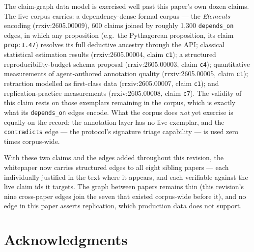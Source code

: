 \documentclass[11pt]{rrxiv}
\begin{document}
\begin{claim}[title=The claim-graph substrate is exercised beyond this paper, type=empirical, evidence=observation, labels={state-of-the-network, small-n}]
\label{claim:corpus-dogfooding}
The claim-graph data model is exercised well past this paper's own dozen claims. The live corpus carries: a dependency-dense formal corpus --- the \emph{Elements} encoding (rrxiv:2605.00009), 600 claims joined by roughly 1{,}300 \texttt{depends\_on} edges, in which any proposition (e.g.\ the Pythagorean proposition, its claim \texttt{prop:I.47}) resolves its full deductive ancestry through the API; classical statistical estimation results (rrxiv:2605.00004, claim \texttt{c1}); a structured reproducibility-budget schema proposal (rrxiv:2605.00003, claim \texttt{c4}); quantitative measurements of agent-authored annotation quality (rrxiv:2605.00005, claim \texttt{c1}); retraction modelled as first-class data (rrxiv:2605.00007, claim \texttt{c1}); and replication-practice measurements (rrxiv:2605.00008, claim \texttt{c7}). The validity of this claim rests on those exemplars remaining in the corpus, which is exactly what its \texttt{depends\_on} edges encode. What the corpus does \emph{not} yet exercise is equally on the record: the annotation layer has no live exemplar, and the \texttt{contradicts} edge --- the protocol's signature triage capability --- is used zero times corpus-wide.
\end{claim}

With these two claims and the edges added throughout this revision, the whitepaper now carries structured edges to all eight sibling papers --- each individually justified in the text where it appears, and each verifiable against the live claim ids it targets. The graph between papers remains thin (this revision's nine cross-paper edges join the seven that existed corpus-wide before it), and no edge in this paper asserts replication, which production data does not support.

\section*{Acknowledgments}
\end{document}

